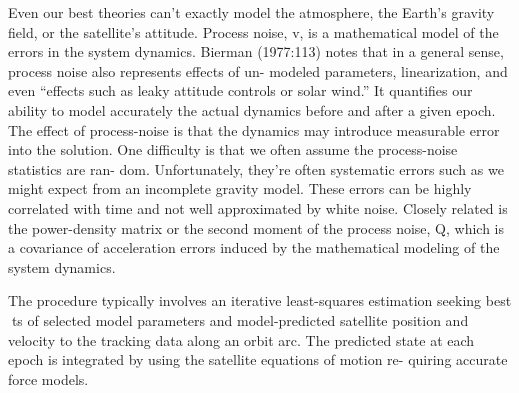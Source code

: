 Even our best theories can’t exactly model the atmosphere, the Earth’s gravity field,
or the satellite’s attitude. Process noise, v, is a mathematical model of the errors in the
system dynamics. Bierman (1977:113) notes that in a general sense, process noise also represents effects of un-
modeled parameters, linearization, and even “effects such as leaky attitude controls or solar
wind.” It quantifies our ability to model accurately the actual dynamics
before and after a given epoch. The effect of process-noise is that the dynamics may introduce measurable error into
the solution. One difficulty is that we often assume the process-noise statistics are ran-
dom. Unfortunately, they’re often systematic errors such as we might expect from an
incomplete gravity model. These errors can be highly correlated with time and not well
approximated by white noise. Closely related is the power-density matrix or the second
moment of the process noise, Q, which is a covariance of acceleration errors induced by
the mathematical modeling of the system dynamics.

The procedure typically involves an iterative least-squares estimation
seeking best ts of selected model parameters and model-predicted satellite
position and velocity to the tracking data along an orbit arc. The predicted
state at each epoch is integrated by using the satellite equations of motion re-
quiring accurate force models.
\fi
